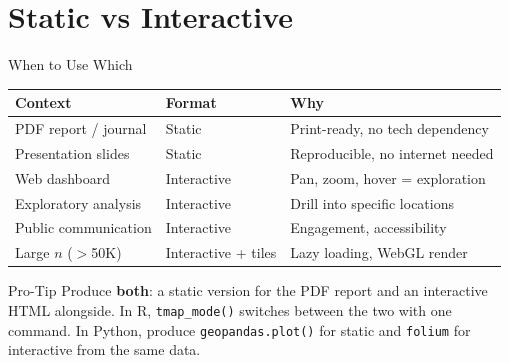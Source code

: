 \documentclass[10pt]{beamer}
\begin{document}
\section{Static vs Interactive}
\begin{frame}{When to Use Which}
\centering
\begin{tabular}{lll}
\toprule
\textbf{Context} & \textbf{Format} & \textbf{Why} \\
\midrule
PDF report / journal & Static & Print-ready, no tech dependency \\
Presentation slides & Static & Reproducible, no internet needed \\
Web dashboard & Interactive & Pan, zoom, hover = exploration \\
Exploratory analysis & Interactive & Drill into specific locations \\
Public communication & Interactive & Engagement, accessibility \\
Large $n$ ($>$50K) & Interactive + tiles & Lazy loading, WebGL render \\
\bottomrule
\end{tabular}
\vspace{6pt}
\begin{alertblock}{Pro-Tip}
Produce \textbf{both}: a static version for the PDF report and an interactive HTML alongside. In R, \texttt{tmap\_mode()} switches between the two with one command. In Python, produce \texttt{geopandas.plot()} for static and \texttt{folium} for interactive from the same data.
\end{alertblock}
\end{frame}
\end{document}
